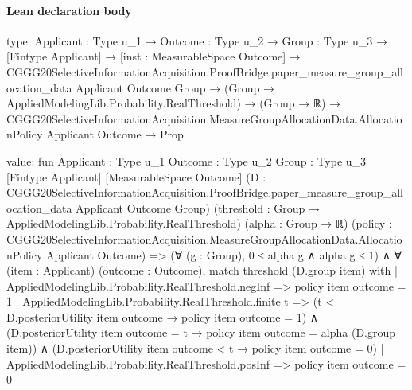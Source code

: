 \documentclass[10pt]{article}
\begin{document}
\paragraph{Lean declaration body}
\begin{ReviewVerbatim}
type:
{Applicant : Type u_1} →
  {Outcome : Type u_2} →
    {Group : Type u_3} →
      [Fintype Applicant] →
        [inst : MeasurableSpace Outcome] →
          CGGG20SelectiveInformationAcquisition.ProofBridge.paper_measure_group_allocation_data Applicant Outcome
              Group →
            (Group → AppliedModelingLib.Probability.RealThreshold) →
              (Group → ℝ) →
                CGGG20SelectiveInformationAcquisition.MeasureGroupAllocationData.AllocationPolicy Applicant Outcome →
                  Prop

value:
fun {Applicant : Type u_1} {Outcome : Type u_2} {Group : Type u_3} [Fintype Applicant] [MeasurableSpace Outcome]
    (D : CGGG20SelectiveInformationAcquisition.ProofBridge.paper_measure_group_allocation_data Applicant Outcome Group)
    (threshold : Group → AppliedModelingLib.Probability.RealThreshold) (alpha : Group → ℝ)
    (policy : CGGG20SelectiveInformationAcquisition.MeasureGroupAllocationData.AllocationPolicy Applicant Outcome) =>
  (∀ (g : Group), 0 ≤ alpha g ∧ alpha g ≤ 1) ∧
    ∀ (item : Applicant) (outcome : Outcome),
      match threshold (D.group item) with
      | AppliedModelingLib.Probability.RealThreshold.negInf => policy item outcome = 1
      | AppliedModelingLib.Probability.RealThreshold.finite t =>
        (t < D.posteriorUtility item outcome → policy item outcome = 1) ∧
          (D.posteriorUtility item outcome = t → policy item outcome = alpha (D.group item)) ∧
            (D.posteriorUtility item outcome < t → policy item outcome = 0)
      | AppliedModelingLib.Probability.RealThreshold.posInf => policy item outcome = 0
\end{ReviewVerbatim}
\end{document}
